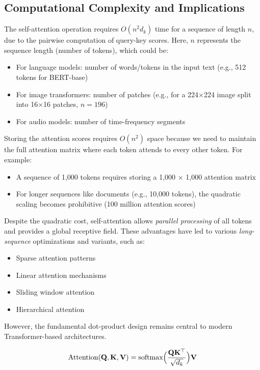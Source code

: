 \subsection{Computational Complexity and Implications}
\noindent
The self-attention operation requires $O(n^2 d_k)$ time for a sequence of length $n$, due to the pairwise computation of query-key scores. Here, $n$ represents the sequence length (number of tokens), which could be:
\begin{itemize}
    \item For language models: number of words/tokens in the input text (e.g., 512 tokens for BERT-base)
    \item For image transformers: number of patches (e.g., for a 224×224 image split into 16×16 patches, $n = 196$)
    \item For audio models: number of time-frequency segments
\end{itemize}

\noindent
Storing the attention scores requires $O(n^2)$ space because we need to maintain the full attention matrix where each token attends to every other token. For example:
\begin{itemize}
    \item A sequence of 1,000 tokens requires storing a 1,000 × 1,000 attention matrix
    \item For longer sequences like documents (e.g., 10,000 tokens), the quadratic scaling becomes prohibitive (100 million attention scores)
\end{itemize}

Despite the quadratic cost, self-attention allows \emph{parallel processing} of all tokens and provides a global receptive field. These advantages have led to various \emph{long-sequence} optimizations and variants, such as:
\begin{itemize}
    \item Sparse attention patterns
    \item Linear attention mechanisms
    \item Sliding window attention
    \item Hierarchical attention
\end{itemize}

However, the fundamental dot-product design remains central to modern Transformer-based architectures.

\begin{equation}\label{eq:attention_mechanism}
\text{Attention}(\mathbf{Q}, \mathbf{K}, \mathbf{V}) 
= \text{softmax}\Bigl(\frac{\mathbf{Q}\mathbf{K}^\top}{\sqrt{d_k}}\Bigr)\mathbf{V}
\end{equation}

